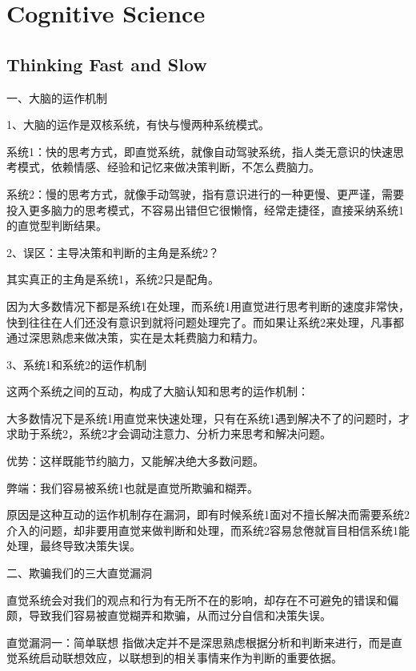 \documentclass[12pt,]{krantz}
\begin{document}
\mainmatter

\chapter{Cognitive Science}\label{cognitive-science}

\section{Thinking Fast and Slow}\label{thinking-fast-and-slow}

一、大脑的运作机制

1、大脑的运作是双核系统，有快与慢两种系统模式。

系统1：快的思考方式，即直觉系统，就像自动驾驶系统，指人类无意识的快速思考模式，依赖情感、经验和记忆来做决策判断，不怎么费脑力。

系统2：慢的思考方式，就像手动驾驶，指有意识进行的一种更慢、更严谨，需要投入更多脑力的思考模式，不容易出错但它很懒惰，经常走捷径，直接采纳系统1的直觉型判断结果。

2、误区：主导决策和判断的主角是系统2？

其实真正的主角是系统1，系统2只是配角。

因为大多数情况下都是系统1在处理，而系统1用直觉进行思考判断的速度非常快，快到往往在人们还没有意识到就将问题处理完了。而如果让系统2来处理，凡事都通过深思熟虑来做决策，实在是太耗费脑力和精力。

3、系统1和系统2的运作机制

这两个系统之间的互动，构成了大脑认知和思考的运作机制：

大多数情况下是系统1用直觉来快速处理，只有在系统1遇到解决不了的问题时，才求助于系统2，系统2才会调动注意力、分析力来思考和解决问题。

优势：这样既能节约脑力，又能解决绝大多数问题。

弊端：我们容易被系统1也就是直觉所欺骗和糊弄。

原因是这种互动的运作机制存在漏洞，即有时候系统1面对不擅长解决而需要系统2介入的问题，却非要用直觉来做判断和处理，而系统2容易怠倦就盲目相信系统1能处理，最终导致决策失误。

二、欺骗我们的三大直觉漏洞

直觉系统会对我们的观点和行为有无所不在的影响，却存在不可避免的错误和偏颇，导致我们容易被直觉糊弄和欺骗，从而过分自信和决策失误。

直觉漏洞一：简单联想
指做决定并不是深思熟虑根据分析和判断来进行，而是直觉系统启动联想效应，以联想到的相关事情来作为判断的重要依据。
\end{document}
